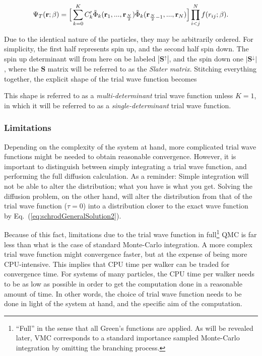 \begin{equation}
 \Psi_T(\mathbf{r}; \beta) = \Big[\sum_{k=0}^K C_k'\tilde\Phi_k(\mathbf{r}_1, ..., \mathbf{r}_{\frac{N}{2}})\tilde\Phi_k(\mathbf{r}_{\frac{N}{2}-1}, ..., \mathbf{r}_{N})\Big]\prod_{i<j}^Nf(r_{ij}; \beta). \label{eq:splitSlater}
\end{equation}

Due to the identical nature of the particles, they may be arbitrarily ordered. For simplicity, the first half represents spin up, and the second half spin down. The spin up determinant will from here on be labeled $|\mathbf{S}^\uparrow|$, and the spin down one $|\mathbf{S}^\downarrow|$, where the $\mathbf{S}$ matrix will be referred to as the \textit{Slater matrix}. Stitching everything together, the explicit shape of the trial wave function becomes


This shape is referred to as a \textit{multi-determinant} trial wave function unless $K=1$, in which it will be referred to as a \textit{single-determinant} trial wave function.

\subsubsection{Limitations}

Depending on the complexity of the system at hand, more complicated trial wave functions might be needed to obtain reasonable convergence. However, it is important to distinguish between simply integrating a trial wave function, and performing the full diffusion calculation. As a reminder: Simple integration will not be able to alter the distribution; what you have is what you get. Solving the diffusion problem, on the other hand, will alter the distribution from that of the trial wave function ($\tau = 0$) into a distribution closer to the exact wave function by Eq.~(\ref{eq:schrodGeneralSolution2}). 

Because of this fact, limitations due to the trial wave function in full\footnote{``Full'' in the sense that all Green's functions are applied. As will be revealed later, VMC corresponds to a standard importance sampled Monte-Carlo integration by omitting the branching process.} QMC is far less than what is the case of standard Monte-Carlo integration. A more complex trial wave function might convergence faster, but at the expense of being more CPU-intensive. This implies that CPU time per walker can be traded for convergence time. For systems of many particles, the CPU time per walker needs to be as low as possible in order to get the computation done in a reasonable amount of time. In other words, the choice of trial wave function needs to be done in light of the system at hand, and the specific aim of the computation. 

